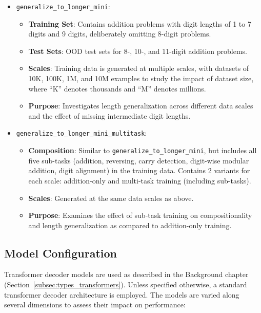 \begin{itemize}
  \item \texttt{generalize\_to\_longer\_mini}:
        \begin{itemize}
          \item \textbf{Training Set}: Contains addition problems with digit lengths of 1 to 7 digits and 9 digits, deliberately omitting 8-digit problems.
          \item \textbf{Test Sets}: OOD test sets for 8-, 10-, and 11-digit addition problems.
          \item \textbf{Scales}: Training data is generated at multiple scales, with datasets of 10K, 100K, 1M, and 10M examples to study the impact of dataset size, where ``K'' denotes thousands and ``M'' denotes millions.
          \item \textbf{Purpose}: Investigates length generalization across different data scales and the effect of missing intermediate digit lengths.
        \end{itemize}

  \item \texttt{generalize\_to\_longer\_mini\_multitask}:
        \begin{itemize}
          \item \textbf{Composition}: Similar to \texttt{generalize\_to\_longer\_mini}, but includes all five sub-tasks (addition, reversing, carry detection, digit-wise modular addition, digit alignment) in the training data. Contains 2 variants for each scale: addition-only and multi-task training (including sub-tasks).
          \item \textbf{Scales}: Generated at the same data scales as above.
          \item \textbf{Purpose}: Examines the effect of sub-task training on compositionality and length generalization as compared to addition-only training.
        \end{itemize}
\end{itemize}

\subsection{Model Configuration}

Transformer decoder models are used as described in the Background chapter (Section~\ref{subsec:types_transformers}). Unless specified otherwise, a standard transformer decoder architecture is employed. The models are varied along several dimensions to assess their impact on performance:

